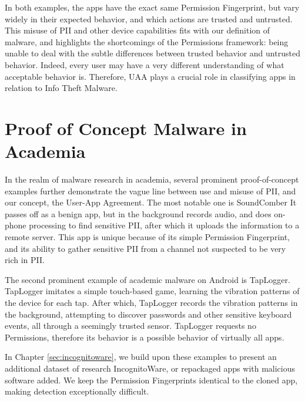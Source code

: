 In both examples, the apps have the exact same Permission Fingerprint, but vary widely in their expected behavior, and which actions are trusted and untrusted. This misuse of PII and other device capabilities fits with our definition of malware, and highlights the shortcomings of the Permissions framework: being unable to deal with the subtle differences between trusted behavior and untrusted behavior. Indeed, every user may have a very different understanding of what acceptable behavior is. Therefore, UAA plays a crucial role in classifying apps in relation to Info Theft Malware.

\section{Proof of Concept Malware in Academia}
In the realm of malware research in academia, several prominent proof-of-concept examples further demonstrate the vague line between use and misuse of PII, and our concept, the User-App Agreement. The most notable one is SoundComber\citep{schlegel2011soundcomber} It passes off as a benign app, but in the background records audio, and does on-phone processing to find sensitive PII, after which it uploads the information to a remote server. This app is unique because of its simple Permission Fingerprint, and its ability to gather sensitive PII from a channel not suspected to be very rich in PII.

The second prominent example of academic malware on Android is TapLogger\citep{xu2012taplogger}. TapLogger imitates a simple touch-based game, learning the vibration patterns of the device for each tap. After which, TapLogger records the vibration patterns in the background, attempting to discover passwords and other sensitive keyboard events, all through a seemingly trusted sensor. TapLogger requests no Permissions, therefore its behavior is a possible behavior of virtually all apps. 

In Chapter \ref{sec:incognitoware}, we build upon these examples to present an additional dataset of research IncognitoWare, or repackaged apps with malicious software added. We keep the Permission Fingerprints identical to the cloned app, making detection exceptionally difficult. 

